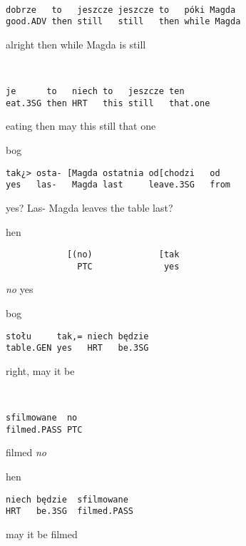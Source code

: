 \documentclass[output=paper]{langsci/langscibook}
\begin{document}
\vspace{2mm}
%
%
%
\begin{transbox}{3}{~}
\begin{verbatim}
dobrze   to   jeszcze jeszcze to   póki Magda
good.ADV then still   still   then while Magda
\end{verbatim}
alright then while Magda is still
\end{transbox}
%
\begin{mdframednoverticalspace}[style=firstfoc]
\begin{transbox}{4}{~}
\begin{verbatim}
je      to   niech to   jeszcze ten
eat.3SG then HRT   this still   that.one
\end{verbatim}
eating then may this still that one
\end{transbox}
\end{mdframednoverticalspace}
%
%
\begin{mdframednoverticalspace}[style=secondfoc]
\begin{transbox}{6}{bog}
\begin{verbatim}
tak¿> osta- [Magda ostatnia od[chodzi   od
yes   las-   Magda last     leave.3SG   from
\end{verbatim}
yes? Las- Magda leaves the table last?
\end{transbox}
\end{mdframednoverticalspace}
%
\begin{transbox}{7}{hen}
\begin{verbatim}
            [(no)             [tak
              PTC              yes
\end{verbatim}
\hspace{2cm} \textit{no} \hspace{2.1cm} yes
\end{transbox}
%
\begin{mdframednoverticalspace}[style=secondfoc]
\begin{transbox}{8}{bog}
\begin{verbatim}
stołu     tak,= niech będzie
table.GEN yes   HRT   be.3SG
\end{verbatim}
right, may it be
\end{transbox}
%
\begin{transbox}{9}{~}
\begin{verbatim}
sfilmowane  no
filmed.PASS PTC
\end{verbatim}
 filmed \textit{no}
\end{transbox}
\end{mdframednoverticalspace}
%
\begin{transbox}{10}{hen}
\begin{verbatim}
niech będzie  sfilmowane
HRT   be.3SG  filmed.PASS
\end{verbatim}
 may it be filmed
\end{transbox}\bigskip
\end{document}
